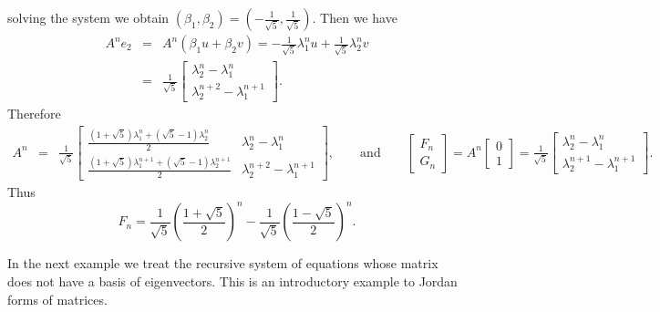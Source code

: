 \documentclass[11pt]{article}
\theoremstyle{definition}
\theoremstyle{plain}
\begin{document}
solving the system we obtain \(  (\beta_1,\beta_2)=\left(-\frac1{\sqrt 5},\frac1{\sqrt 5}\right) \). Then we have \begin{eqnarray*} A^ne_2&=& A^n\left(\beta_1u+\beta_2 v\right)=-\frac1{\sqrt 5}\lambda_1^nu+\frac1{\sqrt 5}\lambda_2^nv\\ &=&\frac1{\sqrt 5}\left[\begin{array}{c}\lambda_2^n-\lambda_1^n\\ \lambda_2^{n+2}-\lambda_1^{n+1} \end{array}\right]. \end{eqnarray*} Therefore \begin{eqnarray*} A^n&=& \frac1{\sqrt 5}\left[\begin{array}{cc}\frac{(1+\sqrt 5)\lambda_1^n+(\sqrt 5-1)\lambda_2^n}2&\lambda_2^n-\lambda_1^n\\ \frac{(1+\sqrt 5)\lambda_1^{n+1}+(\sqrt 5-1)\lambda_2^{n+1}}2&\lambda_2^{n+2}-\lambda_1^{n+1} \end{array}\right], \quad\quad \mbox{and}\quad\quad \left[\begin{array}{c}F_n\\G_n\end{array}\right]=A^n\left[\begin{array}{c}0\\1\end{array}\right]= \frac1{\sqrt 5}\left[\begin{array}{c}\lambda_2^n-\lambda_1^n\\\lambda_2^{n+1}-\lambda_1^{n+1}\end{array}\right]. \end{eqnarray*} Thus \[ F_n=\frac1{\sqrt 5}\left(\frac{1+\sqrt 5}2\right)^n-\frac1{\sqrt 5}\left(\frac{1-\sqrt 5}2\right)^n.\]

In the next example we treat the recursive system of equations whose matrix does not have a basis of eigenvectors. This is an introductory example to Jordan forms of matrices.
\end{document}
